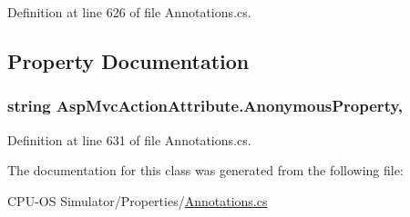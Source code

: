 Definition at line 626 of file Annotations.\+cs.



\subsection{Property Documentation}
\hypertarget{class_asp_mvc_action_attribute_a7068fa64becd1bc3de4622e5a50b0a49}{}
\subsubsection[{Anonymous\+Property}]{\setlength{\rightskip}{0pt plus 5cm}string Asp\+Mvc\+Action\+Attribute.\+Anonymous\+Property\hspace{0.3cm}{\ttfamily [get]}, {}}\label{class_asp_mvc_action_attribute_a7068fa64becd1bc3de4622e5a50b0a49}


Definition at line 631 of file Annotations.\+cs.



The documentation for this class was generated from the following file\+:\begin{DoxyCompactItemize}
\item 
C\+P\+U-\/\+O\+S Simulator/\+Properties/\hyperlink{_annotations_8cs}{Annotations.\+cs}\end{DoxyCompactItemize}
